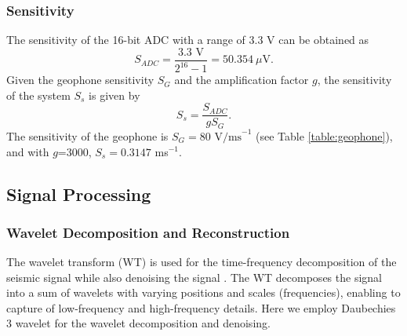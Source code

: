\documentclass[applsci,article,accept,moreauthors,pdftex]{Definitions/mdpi}
\begin{document}
\subsubsection{Sensitivity}
The sensitivity of the 16-bit ADC with a range of 3.3 V can be obtained as
\begin{equation}
	S_{ADC}=\frac{3.3 \text{ V}}{2^{16} - 1} = 50.354\ \mu \text{V}.\label{eq:Sadc}
\end{equation}
Given the geophone sensitivity $S_{G}$ and the amplification factor $g$, the sensitivity  of the system $S_{s}$ is given by 
\begin{equation}
	S_{s} = \frac{S_{ADC}}{gS_{G}}.
	\label{eq:sens}
\end{equation}
The sensitivity of the geophone is $S_{G}=80 \text{ V/ms}^{-1}$ (see Table \ref{table:geophone}), and with $g$=3000, $S_{s}=0.3147$ ms$^{-1}$. 
\subsection {Signal Processing}
\subsubsection{Wavelet Decomposition and Reconstruction}
The wavelet transform (WT) is used for the time-frequency decomposition of the seismic signal while also denoising the signal \cite{donoho1995noising}. The WT decomposes the signal into a sum of wavelets with varying positions and scales (frequencies), enabling to capture of low-frequency and high-frequency details. Here we employ Daubechies 3 wavelet for the wavelet decomposition and denoising.
\end{document}
